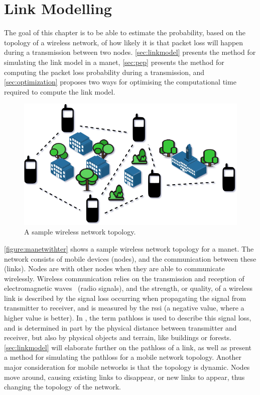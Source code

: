 \chapter{Link Modelling}\label{ch:linkmodel}
The goal of this chapter is to be able to estimate the probability, based on the topology of a wireless network, of how likely it is that packet loss will happen during a transmission between two nodes. \autoref{sec:linkmodel} presents the method for simulating the link model in a \gls{manet}, \autoref{sec:pep} presents the method for computing the packet loss probability during a transmission, and \autoref{sec:optimization} proposes two ways for optimising the computational time required to compute the link model.


\begin{figure}[ht]
    \centering
    \includegraphics[width=.7\textwidth]{figures/manet_with_terrain.png}
    \caption{A sample wireless network topology.}
    \label{figure:manetwithter}
\end{figure}

\autoref{figure:manetwithter} shows a sample wireless network topology for a \acrfull{manet}. The network consists of mobile devices (nodes), and the communication between these (links). Nodes are  with other nodes when they are able to communicate wirelessly. Wireless communication relies on the transmission and reception of electromagnetic waves~\cite[p.~10]{paper:linkmodel} (radio signals), and the strength, or quality, of a wireless link is described by the signal loss occurring when propagating the signal from transmitter to receiver, and is measured by the \gls{rssi} (a negative value, where a higher value is better). In \cite{paper:linkmodel}, the term \gls{pathloss} is used to describe this signal loss, and is determined in part by the physical distance between transmitter and receiver, but also by physical objects and terrain, like buildings or forests. \autoref{sec:linkmodel} will elaborate further on the \gls{pathloss} of a link, as well as present a method for simulating the \gls{pathloss} for a mobile network topology. Another major consideration for mobile networks is that the topology is dynamic. Nodes move around, causing existing links to disappear, or new links to appear, thus changing the topology of the network.

